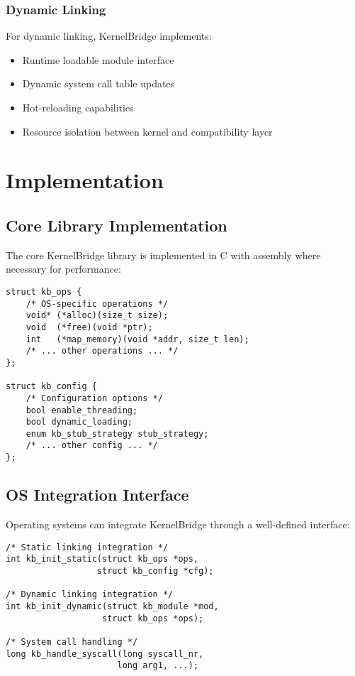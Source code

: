 \documentclass[conference]{IEEEtran}
\begin{document}
\subsubsection{Dynamic Linking}
For dynamic linking, KernelBridge implements:
\begin{itemize}
	\item Runtime loadable module interface
	\item Dynamic system call table updates
	\item Hot-reloading capabilities
	\item Resource isolation between kernel and compatibility layer
\end{itemize}

\section{Implementation}
\subsection{Core Library Implementation}
The core KernelBridge library is implemented in C with assembly where necessary for performance:

\begin{verbatim}
struct kb_ops {
    /* OS-specific operations */
    void* (*alloc)(size_t size);
    void  (*free)(void *ptr);
    int   (*map_memory)(void *addr, size_t len);
    /* ... other operations ... */
};

struct kb_config {
    /* Configuration options */
    bool enable_threading;
    bool dynamic_loading;
    enum kb_stub_strategy stub_strategy;
    /* ... other config ... */
};
\end{verbatim}

\subsection{OS Integration Interface}
Operating systems can integrate KernelBridge through a well-defined interface:

\begin{verbatim}
/* Static linking integration */
int kb_init_static(struct kb_ops *ops, 
                  struct kb_config *cfg);

/* Dynamic linking integration */
int kb_init_dynamic(struct kb_module *mod,
                   struct kb_ops *ops);

/* System call handling */
long kb_handle_syscall(long syscall_nr,
                      long arg1, ...);
\end{verbatim}
\end{document}
